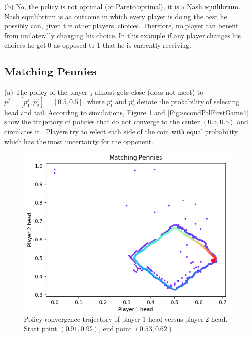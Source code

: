 \documentclass[journal]{IEEEtran}
\begin{document}
(b) No, the policy is not optimal (or Pareto optimal), it is a Nash equilibrium. Nash equilibrium is an outcome in which every player is doing the best he possibly can, given the other players' choices. Therefore, no player can benefit from unilaterally changing his choice. In this example if any player changes his choices he get $0$ as opposed to $1$ that he is currently receiving.

\subsection{Matching Pennies}
(a) The policy of the player $j$ almost gets close (does not meet) to $p^{j}= [p^{j}_{1}, p_{2}^{j}]=[0.5, 0.5]$, where $p^{j}_{1}$ and $p^{j}_{2}$ denote the probability of selecting head and tail. According to simulations, Figure \ref{Fig:secondPolFirstGame3} and \ref{Fig:secondPolFirstGame4} show the trajectory of policies that do not converge to the center $(0.5, 0.5)$ and circulates it \cite{the}. Players try to select each side of the coin with equal probability which has the most uncertainty for the opponent.


\begin{figure}[!t]
\centering
\includegraphics[scale=0.35]{figure/secondGameFirstPolicy2m.png}
\caption{Policy convergence trajectory of player 1 head versus player 2 head. Start point $(0.91, 0.92)$, end point $(0.53, 0.62)$}
\label{Fig:secondPolFirstGame3}
\end{figure}
\end{document}
